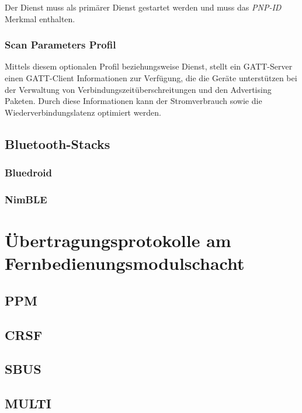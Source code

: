 Der Dienst muss als primärer Dienst gestartet werden und muss das \textit{PNP-ID} Merkmal enthalten. \cite[S.~14f.]{bluetoothHOGP}

\subsubsection{Scan Parameters Profil}
Mittels diesem optionalen Profil beziehungsweise Dienst, stellt ein \acs{GATT}-Server einen \acs{GATT}-Client Informationen zur Verfügung, die die Geräte unterstützen bei der Verwaltung von Verbindungszeitüberschreitungen und den Advertising Paketen. Durch diese Informationen kann der Stromverbrauch sowie die Wiederverbindungslatenz optimiert werden. \cite[S.~6]{bluetoothScan}

\subsection{Bluetooth-Stacks}
\subsubsection{Bluedroid}
\subsubsection{NimBLE}

\section{Übertragungsprotokolle am Fernbedienungsmodulschacht}

\subsection{\acf{PPM}}

\subsection{CRSF}

\subsection{SBUS}

\subsection{MULTI}

